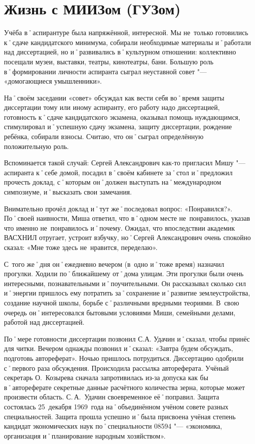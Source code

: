 ﻿\chapter{Жизнь с МИИЗом (ГУЗом)}

Учёба в˚аспирантуре была напряжённой, интересной. Мы не~только готовились к˚сдаче кандидатского минимума, собирали необходимые материалы и˚работали над диссертацией, но и˚развивались в˚культурном отношении: коллективно посещали музеи, выставки, театры, кинотеатры, бани. Большую роль в˚формировании личности аспиранта сыграл неуставной совет "--- «домогающиеся умышленники». 

На˚своём заседании «совет» обсуждал как вести себя во˚время защиты диссертации тому или иному аспиранту, его работу надо диссертацией, готовность к˚сдаче кандидатского экзамена, оказывал помощь нуждающимся, стимулировал и˚успешную сдачу экзамена, защиту диссертации, рождение ребёнка, собирали взносы. Считаю, что он˚сыграл определённую положительную роль.

Вспоминается такой случай: Сергей Александрович как-то пригласил Мишу "--- аспиранта к˚себе домой, посадил в˚своём кабинете за˚стол и˚предложил прочесть доклад, с˚которым он˚должен выступать на˚международном симпозиуме, и˚высказать свои замечания.

Внимательно прочёл доклад и˚тут же˚последовал вопрос: «Понравился?». По˚своей наивности, Миша ответил, что в˚одном месте не~понравилось, указав что именно не~понравилось и˚почему. Ожидал, что впоследствии академик ВАСХНИЛ отругает, устроит взбучку, но˚Сергей Александрович очень спокойно сказал: «Мне тоже здесь не~нравится, переделаю».

С~того же˚дня он˚ежедневно вечером (в~одно и˚тоже время) назначил прогулки. Ходили по˚ближайшему от˚дома улицам. Эти прогулки были очень интересными, познавательными и˚поучительными. Он рассказывал сколько сил и˚энергии пришлось ему потратить за˚сохранение и˚развитие землеустройства, создание научной школы, борьбе с˚различными вредными теориями. В~свою очередь он˚интересовался бытовыми условиями Миши, семейными делами, работой над диссертацией.

По˚мере готовности диссертации позвонил С.А. Удачин и˚сказал, чтобы принёс для читки. Вечером однажды позвонил и˚сказал: «Завтра будем обсуждать, подготовь автореферат». Ночью пришлось потрудиться. Диссертацию одобрили с˚первого раза обсуждения. Происходила рассылка автореферата. Учёный секретарь О.~Козырева сначала запротивилась из-за допуска как бы в˚автореферате секретные данные расчётного количества зерна, которые может произвести область. С.\,А.~Удачин своевременное её˚поправил. Защита состоялась 25~декабря 1969~года на˚объединённом учёном совете разных специальностей. Защита прошла успешно и˚была присвоена учёная степень кандидат экономических наук по˚специальности 08594 "--- «экономика, организация и˚планирование народным хозяйством». 

